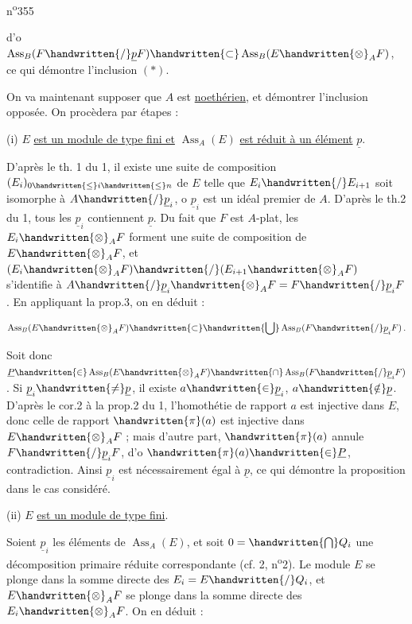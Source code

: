 \noindent\hfill n\textsuperscript{o}355

d'o $\operatorname{Ass}_B(F\handwritten{/}\underline p F)\handwritten{\subset}\operatorname{Ass}_B(E\handwritten{\otimes}_A F)$, ce qui démontre l'inclusion $(\ast)$.

On va maintenant supposer que $A$ est \uline{noethérien}, et démontrer l'inclusion opposée. On procèdera par étapes :

(i) $E$ \uline{est un module de type fini et} $\operatorname{Ass}_A(E)$ \uline{est réduit à un élément} $\underline p$.

D'après le th. 1 du \handwritten{\S}{} 1, il existe une suite de composition $(E_i)_{0\handwritten{\leq} i\handwritten{\leq} n}$ de $E$ telle que $E_i\handwritten{/}E_{i+1}$ soit isomorphe à $A\handwritten{/}\underline p_i$, o $\underline p_i$ est un idéal premier de $A$. D'après le th.2 du \handwritten{\S}{} 1, tous les $\underline p_i$ contiennent $\underline p$. Du fait que $F$ est $A$-plat, les $E_i\handwritten{\otimes}_A F$ forment une suite de composition de $E\handwritten{\otimes}_A F$, et $(E_i\handwritten{\otimes}_A F)\handwritten{/}(E_{i+1}\handwritten{\otimes}_A F)$ s'identifie à $A\handwritten{/}\underline p_i\handwritten{\otimes}_A F=F\handwritten{/}\underline p_i F$. En appliquant la prop.3, on en déduit :

\[
\operatorname{Ass}_B(E\handwritten{\otimes}_A F)\handwritten{\subset}\handwritten{\bigcup}\operatorname{Ass}_B(F\handwritten{/}\underline p_i F)\,.
\]

Soit donc $\underline P\handwritten{\in}\operatorname{Ass}_B(E\handwritten{\otimes}_A F)\handwritten{\cap}\operatorname{Ass}_B(F\handwritten{/}\underline p_i F)$. Si $\underline p_i\handwritten{\ne}\underline p$, il existe $a\handwritten{\in}\underline p_i$, $a\handwritten{\notin}\underline p$. D'après le cor.2 à la prop.2 du \handwritten{\S}{} 1, l'homothétie de rapport $a$ est injective dans $E$, donc celle de rapport $\handwritten{\pi}(a)$ est injective dans $E\handwritten{\otimes}_A F$ ; mais d'autre part, $\handwritten{\pi}(a)$ annule $F\handwritten{/}\underline p_i F$, d'o $\handwritten{\pi}(a)\handwritten{\in}\underline P$, contradiction. Ainsi $\underline p_i$ est nécessairement égal à $\underline p$, ce qui démontre la proposition dans le cas considéré.

(ii) $E$ \uline{est un module de type fini}.

Soient $\underline p_i$ les éléments de $\operatorname{Ass}_A(E)$, et soit $0=\handwritten{\bigcap} Q_i$ une décomposition primaire réduite correspondante (cf. \handwritten{\S}{} 2, n\textsuperscript{o}2). Le module $E$ se plonge dans la somme directe des $E_i=E\handwritten{/}Q_i$, et $E\handwritten{\otimes}_A F$ se plonge dans la somme directe des $E_i\handwritten{\otimes}_A F$. On en déduit :

